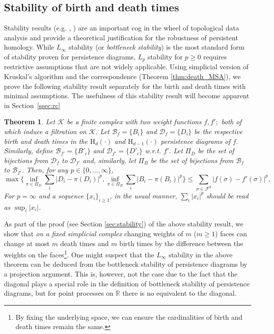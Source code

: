 \documentclass[12pt]{amsart}
\newcommand{\red}[1]{\textcolor{red}{#1}}
\newcommand{\gt}[1]{\textcolor{blue}{#1}}
\renewcommand{\red}[1]{#1}
\renewcommand{\gt}[1]{#1}
\newtheorem{theorem}{Theorem}[section]
\numberwithin{equation}{section}
\numberwithin{theorem}{section}
\newcommand{\Hg}{\mathrm{H}}
\newcommand{\1}{\mathbf{1}}
\def\F{\mathcal{F}}
\def\K{\mathcal{K}}
\def\bR{\mathbb{R}}
\begin{document}

\subsection{ Stability of birth and death times}
\label{ssec:stability}

Stability results (e.g. \cite[Section VIII.2]{Edelsbrunner10}, \cite{chazal2009proximity,chazal2014persistence,cohen2007stability,cohen2010lipschitz}) are an important cog in the wheel of topological data analysis and provide a theoretical justification for the robustness of persistent homology. While $L_{\infty}$ stability (or {\em bottleneck stability}) is the most standard form of stability proven for persistence diagrams, $L_p$ stability for $p \geq 0$ requires restrictive assumptions that are not widely applicable. Using  simplicial version of Kruskal's algorithm and the correspondence (Theorem \ref{thm:death_MSA}), we prove the following stability result  separately for the birth and death times with minimal assumptions. The usefulness of this stability result will become apparent in Section~\ref{ssec:rc}
%
\begin{theorem}
\label{thm:l1_stability}
Let $\K$ be a finite complex with two weight functions \gt{$f, f';$} both of which induce a filtration on $\K.$ Let $\mathcal{B}_f  = \{B_i\}$ and $\mathcal{D}_f = \{D_i\}$ be the respective birth and death times in the $\Hg_d(\cdot)$ and $\Hg_{d-1}(\cdot)$ persistence diagrams of $f.$ Similarly, define  \gt{$\mathcal{B}_{f'}  =  \{B'_i\}$} and \gt{$\mathcal{D}_{f'} = \{D'_i\}$ w.r.t. $f'.$} Let $\Pi_D$ be the set of bijections from $\mathcal{D}_f$ to \gt{$\mathcal{D}_{f'}$} and, similarly, let $\Pi_B$ be the set of bijections from $\mathcal{B}_f$ to \gt{$\mathcal{B}_{f'}$}. Then, for any $p \in \{0,\ldots,\infty\}$,
%
\[   \max\{\textstyle{\inf_{\pi \in \Pi_D}}\sum_i|D_i - \pi(D_i)|^p, \textstyle{\inf_{\pi \in \Pi_B}} \sum_i|B_i - \pi(B_i)|^p\} \leq \sum_{\sigma \in \F^d}|f(\sigma) - f'(\sigma)|^p,\]
%
%
For $p = \infty$ and a sequence $\{x_i\}_{i \geq 1}$, in the usual manner, $\sum_i |x_i|^p$ should be read as $\sup_i |x_i|$.
\end{theorem}
%

As part of the proof (see Section \ref{sec:stability}) of the above stability result, we show that \emph{on a fixed simplicial complex} changing weights of $m$ ($m \geq 1$) faces can change at most $m$ death times and $m$ birth times by the difference between the weights on the faces\footnote{By fixing the underlying space, we can ensure the cardinalities of birth and death times remain the same.}. One might suspect that the $L_{\infty}$ stability in the above theorem can be deduced from the bottleneck stability of persistence diagrams by a projection argument. 
This is, however, not the case due to the fact that the diagonal plays a special role in the definition of bottleneck stability of persistence diagrams, \gt{but for point processes on $\bR$ there is no equivalent to the diagonal}.
\end{document}
